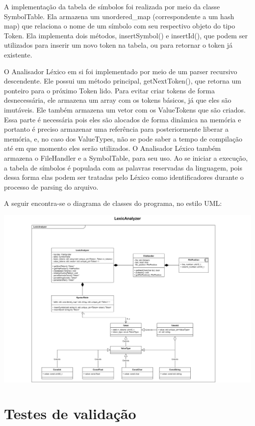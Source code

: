 A implementação da tabela de símbolos foi realizada por meio da classe SymbolTable.
Ela armazena um unordered\_map (correspondente a um hash map) que relaciona o nome de um símbolo com seu respectivo objeto do tipo Token.
Ela implementa dois métodos, insertSymbol() e insertId(), que podem ser utilizados para inserir um novo token na tabela, ou para retornar o token já existente.

O Analisador Léxico em si foi implementado por meio de um parser recursivo descendente. Ele possui um método principal, getNextToken(), que retorna um ponteiro para o próximo Token lido.
Para evitar criar tokens de forma desnecessária, ele armazena um array com os tokens básicos, já que eles são imutáveis.
Ele também armazena um vetor com os ValueTokens que são criados.
Essa parte é necessária pois eles são alocados de forma dinâmica na memória e portanto é preciso armazenar uma referência para posteriormente liberar a memória, e, no caso dos ValueTypes, não se pode saber a tempo de compilação até em que momento eles serão utilizados.
O Analisador Léxico também armazena o FileHandler e a SymbolTable, para seu uso.
Ao se iniciar a execução, a tabela de símbolos é populada com as palavras reservadas da linguagem, pois dessa forma elas podem ser tratadas pelo Léxico como identificadores durante o processo de parsing do arquivo.

A seguir encontra-se o diagrama de classes do programa, no estilo UML:

\includegraphics[width=\linewidth]{2-Imagens/Lexico-UML.png}

\section{Testes de validação}
\label{sec:lexicoTestes}

